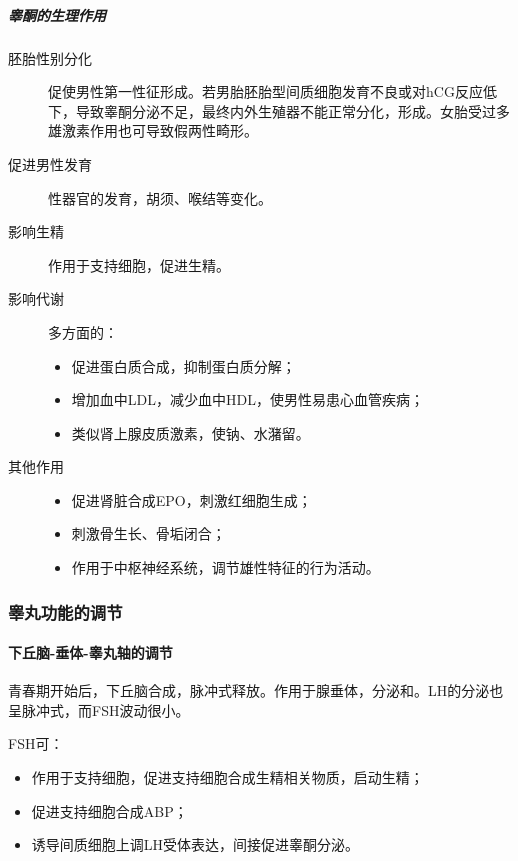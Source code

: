 \subparagraph{睾酮的生理作用}

\begin{description}
	\item[胚胎性别分化] 促使男性第一性征形成。若男胎胚胎型间质细胞发育不良或对hCG反应低下，导致睾酮分泌不足，最终内外生殖器不能正常分化，形成。女胎受过多雄激素作用也可导致假两性畸形。
	\item[促进男性发育] 性器官的发育，胡须、喉结等变化。
	\item[影响生精] 作用于支持细胞，促进生精。
	\item[影响代谢] 多方面的：
	\begin{itemize}
		\item 促进蛋白质合成，抑制蛋白质分解；
		\item 增加血中LDL，减少血中HDL，使男性易患心血管疾病；
		\item 类似肾上腺皮质激素，使钠、水潴留。
	\end{itemize}
	\item[其他作用] \begin{itemize}
		\item 促进肾脏合成EPO，刺激红细胞生成；
		\item 刺激骨生长、骨垢闭合；
		\item 作用于中枢神经系统，调节雄性特征的行为活动。
	\end{itemize}
\end{description}

\subsubsection{睾丸功能的调节}

\paragraph{下丘脑-垂体-睾丸轴的调节}

青春期开始后，下丘脑合成，脉冲式释放。作用于腺垂体，分泌和。LH的分泌也呈脉冲式，而FSH波动很小。

FSH可：

\begin{itemize}
	\item 作用于支持细胞，促进支持细胞合成生精相关物质，启动生精；
	\item 促进支持细胞合成ABP；
	\item 诱导间质细胞上调LH受体表达，间接促进睾酮分泌。
\end{itemize}

